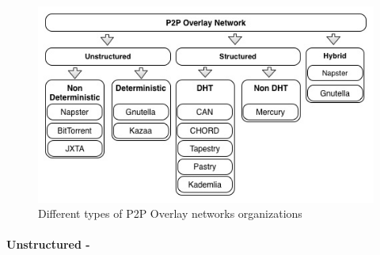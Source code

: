 \documentclass{./llncs2e/llncs}
\begin{document}
\begin{figure}[bh!]
  \begin{center}
    \includegraphics[width=\textwidth]{./img/p2porganizations.jpg}
  \end{center}
  \caption{Different types of P2P Overlay networks organizations}
  \label{fig:Different types of P2P Overlay networks organizations}
\end{figure}


\paragraph{\textbf{Unstructured -}} %
\label{par:Unstructured}
\end{document}
